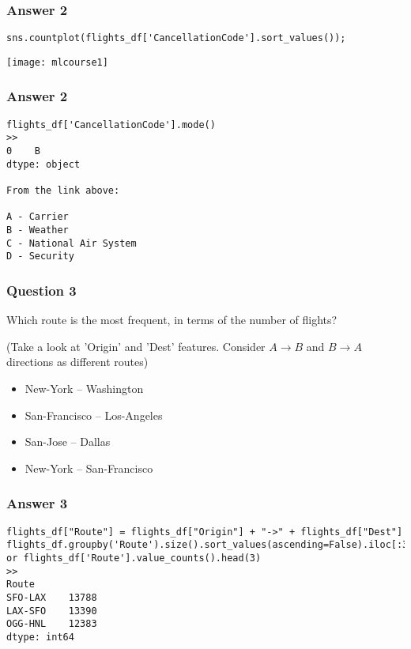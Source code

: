 \begin{frame}[fragile]\frametitle{Answer 2}
\begin{lstlisting}
sns.countplot(flights_df['CancellationCode'].sort_values());
\end{lstlisting}
\begin{center}
\texttt{[image: mlcourse1]}
\end{center}
\end{frame}

\begin{frame}[fragile]\frametitle{Answer 2}
\begin{lstlisting}
flights_df['CancellationCode'].mode()
>>
0    B
dtype: object

From the link above:

A - Carrier 
B - Weather 
C - National Air System 
D - Security
\end{lstlisting}

\end{frame}



\begin{frame}[fragile]\frametitle{Question 3}
Which route is the most frequent, in terms of the number of flights?

(Take a look at 'Origin' and 'Dest' features. Consider $A \rightarrow B$ and $B \rightarrow A$ directions as different routes)
\begin{itemize}
\item New-York – Washington
\item San-Francisco – Los-Angeles
\item San-Jose – Dallas
\item New-York – San-Francisco
\end{itemize}

\end{frame}

\begin{frame}[fragile]\frametitle{Answer 3}
\begin{lstlisting}
flights_df["Route"] = flights_df["Origin"] + "->" + flights_df["Dest"]
flights_df.groupby('Route').size().sort_values(ascending=False).iloc[:3]
or flights_df['Route'].value_counts().head(3)
>>
Route
SFO-LAX    13788
LAX-SFO    13390
OGG-HNL    12383
dtype: int64
\end{lstlisting}

\end{frame}

